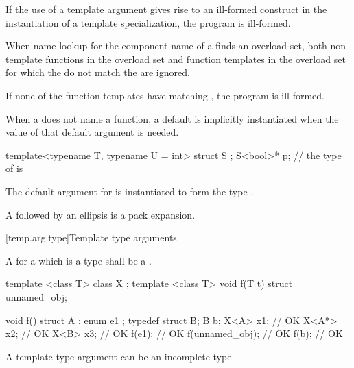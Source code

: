\pnum
If the use of a template argument
gives rise to an ill-formed construct in the instantiation of a
template specialization, the program is ill-formed.

\pnum
When name lookup for the component name of a
finds an overload set, both non-template functions in the overload
set and function templates in the overload set for
which the
do not match the
are ignored.
\begin{note}
If none of the function templates have matching
,
the program is ill-formed.
\end{note}

\pnum
When a  does not name a function,
a default  is
implicitly instantiated
when the value of that default argument is needed.
\begin{example}
\begin{codeblock}
template<typename T, typename U = int> struct S { };
S<bool>* p;         // the type of  is 
\end{codeblock}
The default argument for  is instantiated to form the type .
\end{example}

\pnum
A  followed by an ellipsis is
a pack expansion.

[temp.arg.type]{Template type arguments}

\pnum
A
for a
which is a type
shall be a
.

\pnum
\begin{example}
\begin{codeblock}
template <class T> class X { };
template <class T> void f(T t) { }
struct { } unnamed_obj;

void f() {
  struct A { };
  enum { e1 };
  typedef struct { } B;
  B b;
  X<A> x1;          // OK
  X<A*> x2;         // OK
  X<B> x3;          // OK
  f(e1);            // OK
  f(unnamed_obj);   // OK
  f(b);             // OK
}
\end{codeblock}
\end{example}
\begin{note}
A template type argument can be an incomplete type.
\end{note}

